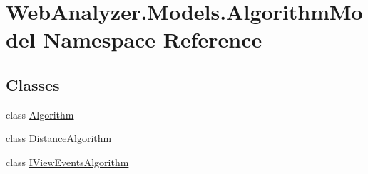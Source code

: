 \hypertarget{namespace_web_analyzer_1_1_models_1_1_algorithm_model}{}\section{Web\+Analyzer.\+Models.\+Algorithm\+Model Namespace Reference}
\label{namespace_web_analyzer_1_1_models_1_1_algorithm_model}
\subsection*{Classes}
\begin{DoxyCompactItemize}
\item 
class \hyperlink{class_web_analyzer_1_1_models_1_1_algorithm_model_1_1_algorithm}{Algorithm}
\item 
class \hyperlink{class_web_analyzer_1_1_models_1_1_algorithm_model_1_1_distance_algorithm}{Distance\+Algorithm}
\item 
class \hyperlink{class_web_analyzer_1_1_models_1_1_algorithm_model_1_1_i_view_events_algorithm}{I\+View\+Events\+Algorithm}
\end{DoxyCompactItemize}
